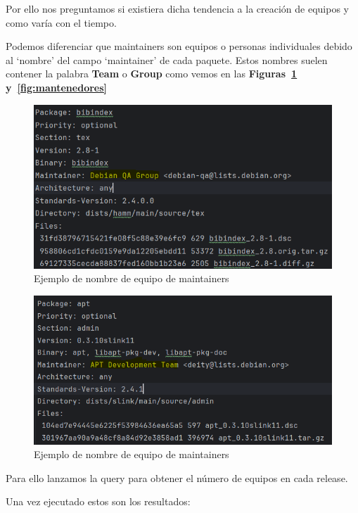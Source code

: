 \documentclass[a4paper, 12pt]{book}
\begin{document}
Por ello nos preguntamos si existiera dicha tendencia a la creación de equipos y como varía con el tiempo.

Podemos diferenciar que maintainers son equipos o personas individuales debido al `nombre' del campo `maintainer' de cada paquete. Estos nombres suelen contener la palabra \textbf{Team} o \textbf{Group} como vemos en las \textbf{Figuras~\ref{fig:ejemplo_equipo_1} y~\ref{fig:mantenedores}}

\begin{figure}
	\centering
	\includegraphics[width=15cm, keepaspectratio]{img/Ejemplo equipo 1.png}
	\caption{Ejemplo de nombre de equipo de maintainers}
	\label{fig:ejemplo_equipo_1}
\end{figure}

\begin{figure}
	\centering
	\includegraphics[width=15cm, keepaspectratio]{img/Ejemplo equipo 2.png}
	\caption{Ejemplo de nombre de equipo de maintainers}
	\label{fig:ejemplo_equipo_2}
\end{figure}

Para ello lanzamos la query para obtener el número de equipos en cada release.

Una vez ejecutado estos son los resultados:
\end{document}
